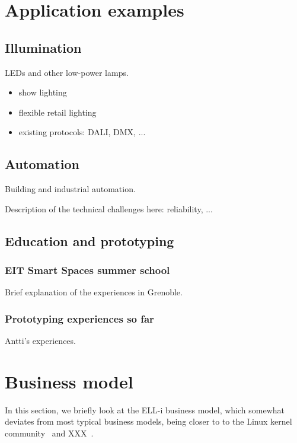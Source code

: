 \documentclass[draft,a4paper]{siamltex}
\begin{document}
\section{Application examples}
\label{sec:examples}

\subsection{Illumination}

LEDs and other low-power lamps.

\begin{itemize}
  \item show lighting
  \item flexible retail lighting
  \item existing protocols: DALI, DMX, ...
\end{itemize}

\subsection{Automation}

Building and industrial automation.

Description of the technical challenges here: reliability, ...

\subsection{Education and prototyping}

\subsubsection{EIT Smart Spaces summer school}

Brief explanation of the experiences in Grenoble.

\subsubsection{Prototyping experiences so far}

Antti's experiences.
 

\section{Business model}
\label{sec:business}

In this section, we briefly look at the ELL-i business model, which
somewhat deviates from most typical business models, being closer to
to the Linux kernel community~\cite{Linux-kernel-need-reference}
and XXX~\cite{Something-else-need-reference}.
\end{document}
